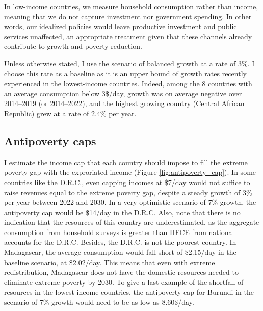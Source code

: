 In low-income countries, we measure household consumption rather than income, meaning that we do not capture investment nor government spending. In other words, our idealized policies would leave productive investment and public services unaffected, an appropriate treatment given that these channels already contribute to growth and poverty reduction.

Unless otherwise stated, I use the scenario of balanced growth at a rate of 3\%. I choose this rate as a baseline as it is an upper bound of growth rates recently experienced in the lowest-income countries. Indeed, among the 8 countries with an average consumption below 3\$/day, growth was on average negative over 2014--2019 (or 2014--2022), and the highest growing country (Central African Republic) grew at a rate of 2.4\% per year. 

\subsection{Antipoverty caps}

I estimate the income cap that each country should impose to fill the extreme poverty gap with the exproriated income (Figure \ref{fig:antipoverty_cap}). 
In some countries like the D.R.C., even capping incomes at \$7/day would not suffice to raise revenues equal to the extreme poverty gap, despite a steady growth of 3\% per year between 2022 and 2030. 
In a very optimistic scenario of 7\% growth, the antipoverty cap would be \$14/day in the D.R.C. Also, note that there is no indication that the resources of this country are underestimated, as the aggregate consumption from household surveys is greater than HFCE from national accounts for the D.R.C. 
Besides, the D.R.C. is not the poorest country. 
In Madagascar, the average consumption would fall short of \$2.15/day in the baseline scenario, at \$2.02/day. This means that even with extreme redistribution, Madagascar does not have the domestic resources needed to eliminate extreme poverty by 2030. 
To give a last example of the shortfall of resources in the lowest-income countries, the antipoverty cap for Burundi in the scenario of 7\% growth would need to be as low as 8.60\$/day. 

